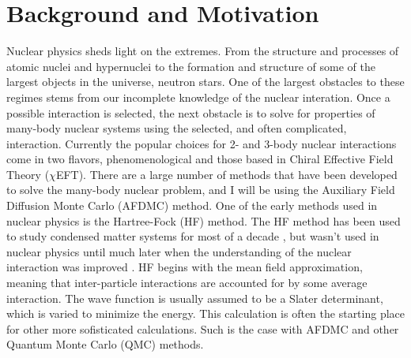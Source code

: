 \section{Background and Motivation}
Nuclear physics sheds light on the extremes. From the structure and processes of atomic nuclei and hypernuclei to the formation and structure of some of the largest objects in the universe, neutron stars. One of the largest obstacles to these regimes stems from our incomplete knowledge of the nuclear interation. Once a possible interaction is selected, the next obstacle is to solve for properties of many-body nuclear systems using the selected, and often complicated, interaction. Currently the popular choices for 2- and 3-body nuclear interactions come in two flavors, phenomenological and those based in Chiral Effective Field Theory ($\chi$EFT). There are a large number of methods that have been developed to solve the many-body nuclear problem, and I will be using the Auxiliary Field Diffusion Monte Carlo (AFDMC) method. One of the early methods used in nuclear physics is the Hartree-Fock (HF) method. The HF method has been used to study condensed matter systems for most of a decade \cite{hartree1928, fock1930, slater1951}, but wasn't used in nuclear physics until much later when the understanding of the nuclear interaction was improved \cite{zofka1970, gogny1986}. HF begins with the mean field approximation, meaning that inter-particle interactions are accounted for by some average interaction. The wave function is usually assumed to be a Slater determinant, which is varied to minimize the energy. This calculation is often the starting place for other more sofisticated calculations. Such is the case with AFDMC and other Quantum Monte Carlo (QMC) methods.

